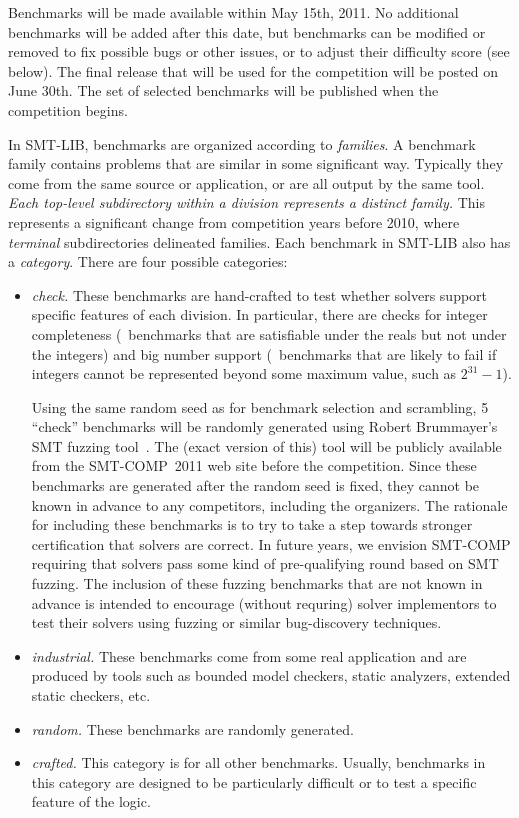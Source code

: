 \documentclass[12pt]{article}
\begin{document}
Benchmarks will be made available within May 15th, 2011.
No additional
benchmarks will be added after this date, but benchmarks can be
modified or removed to fix possible bugs or other issues, or to adjust their difficulty score (see below). 
The final release that will be used for the competition will be posted on June
30th. The set of selected benchmarks will be published when the
competition begins.

In SMT-LIB, benchmarks are organized according to \emph{families}.  A benchmark
family contains problems that are similar in some significant way.  Typically
they come from the same source or application, or are all output by the same
tool.  \emph{Each top-level subdirectory within a division represents a distinct
family.}  This represents a significant change from
competition years before 2010, where
\emph{terminal} subdirectories delineated families.
%
Each benchmark in SMT-LIB also has a \emph{category}.  There are four possible
categories:
%
\begin{itemize}
\item \emph{check.} These benchmarks are hand-crafted to test whether
  solvers support specific features of each division.  In particular,
  there are checks for integer completeness (\ie\ benchmarks that are
  satisfiable under the reals but not under the integers) and big
  number support (\ie\ benchmarks that are likely to fail if integers
  cannot be represented beyond some maximum value, such as
  $2^{31}-1$).

  \noindent%
  Using the same random seed as
  for benchmark selection and scrambling, 5 ``check'' benchmarks will
  be randomly generated using Robert Brummayer's SMT fuzzing
  tool~\cite{brummayer+09}.  The (exact version of this) tool will be
  publicly available from the SMT-COMP~2011 web site before the
  competition.  Since these benchmarks are generated after the random
  seed is fixed, they cannot be known in advance to any competitors,
  including the organizers.  The rationale for including these
  benchmarks is to try to take a step towards stronger certification
  that solvers are correct.  In future years, we envision SMT-COMP
  requiring that solvers pass some kind of pre-qualifying round based
  on SMT fuzzing.  The inclusion of these fuzzing benchmarks that are
  not known in advance is intended to encourage (without requring)
  solver implementors to test their solvers using fuzzing or similar
  bug-discovery techniques.
\item \emph{industrial.} These benchmarks come from some real application
      and are produced by tools such as bounded model checkers, static analyzers, extended
      static checkers, etc.
\item \emph{random.} These benchmarks are randomly generated.
\item \emph{crafted.} This category is for all other benchmarks.  Usually,
  benchmarks in this category are designed to be particularly difficult or to
  test a specific feature of the logic.
\end{itemize}
\end{document}
